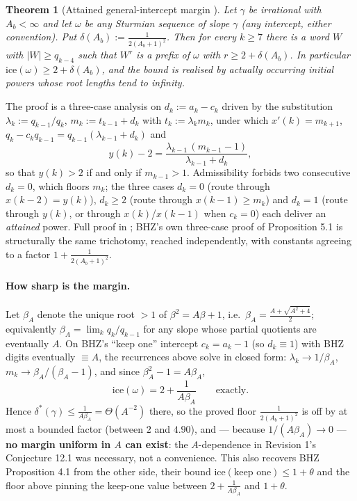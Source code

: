 \documentclass[11pt]{article}
\newtheorem{theorem}{Theorem}[section]
\begin{document}
\begin{theorem}[Attained general-intercept margin \cite{Phase8Proof}]
\label{thm:generalmargin}
Let $\gamma$ be irrational with $A_b<\infty$ and let $\omega$ be any Sturmian sequence of slope
$\gamma$ (any intercept, either convention). Put $\delta(A_b):=\frac1{2(A_b+1)^2}$. Then for every
$k\ge7$ there is a word $W$ with $|W|\ge q_{k-4}$ such that $W^r$ is a prefix of $\omega$ with
$r\ge2+\delta(A_b)$. In particular $\text{ice}(\omega)\ge2+\delta(A_b)$, and the bound is realised by
actually occurring initial powers whose root lengths tend to infinity.
\end{theorem}

The proof is a three-case analysis on $d_k:=a_k-c_k$ driven by the substitution
$\lambda_k:=q_{k-1}/q_k$, $m_k:=t_{k-1}+d_k$ with $t_k:=\lambda_km_k$, under which
$x'(k)=m_{k+1}$, $q_k-c_kq_{k-1}=q_{k-1}(\lambda_{k-1}+d_k)$ and
\[
y(k)-2=\frac{\lambda_{k-1}\,(m_{k-1}-1)}{\lambda_{k-1}+d_k},
\]
so that $y(k)>2$ if and only if $m_{k-1}>1$. Admissibility forbids two consecutive $d_k=0$, which
floors $m_k$; the three cases $d_k=0$ (route through $x(k-2)=y(k)$), $d_k\ge2$ (route through
$x(k-1)\ge m_k$) and $d_k=1$ (route through $y(k)$, or through $x(k)$/$x(k-1)$ when $c_k=0$) each
deliver an \emph{attained} power. Full proof in \cite{Phase8Proof}; BHZ's own three-case proof of
Proposition 5.1 is structurally the same trichotomy, reached independently, with constants agreeing
to a factor $1+\frac1{2(A_b+1)^2}$.

\paragraph{How sharp is the margin.} Let $\beta_A$ denote the unique root $>1$ of
$\beta^2=A\beta+1$, i.e.\ $\beta_A=\frac{A+\sqrt{A^2+4}}2$; equivalently
$\beta_A=\lim_kq_k/q_{k-1}$ for any slope whose partial quotients are eventually $A$. On BHZ's
``keep one'' intercept $c_k=a_k-1$ (so $d_k\equiv1$) with BHZ digits eventually $\equiv A$, the
recurrences above solve in closed form: $\lambda_k\to1/\beta_A$, $m_k\to\beta_A/(\beta_A-1)$, and
since $\beta_A^2-1=A\beta_A$,
\[
\text{ice}(\omega)=2+\frac1{A\beta_A}\qquad\text{exactly.}
\]
Hence $\delta^*(\gamma)\le\frac1{A\beta_A}=\Theta(A^{-2})$ there, so the proved floor
$\frac1{2(A_b+1)^2}$ is off by at most a bounded factor (between $2$ and $4.90$), and --- because
$1/(A\beta_A)\to0$ --- \textbf{no margin uniform in $A$ can exist}: the $A$-dependence in
Revision 1's Conjecture 12.1 was necessary, not a convenience. This also recovers BHZ Proposition
4.1 from the other side, their bound $\text{ice}(\text{keep one})\le1+\theta$ and the floor above
pinning the keep-one value between $2+\frac1{A\beta_A}$ and $1+\theta$.
\end{document}
